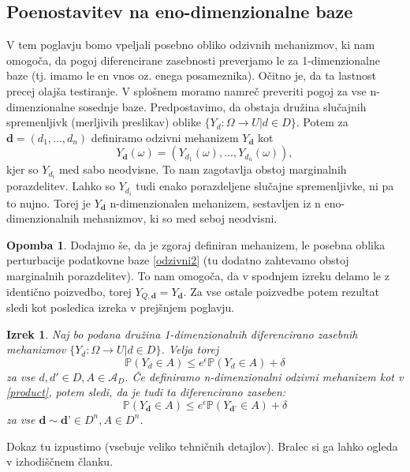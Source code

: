 \documentclass[12pt,a4paper]{amsart}
\theoremstyle{definition} %
\newtheorem{opomba}[definicija]{Opomba}
\theoremstyle{plain} %
\newtheorem{izrek}[definicija]{Izrek}
\begin{document}
\subsection{Poenostavitev na eno-dimenzionalne baze}
V tem poglavju bomo vpeljali posebno obliko odzivnih mehanizmov, ki nam omogoča, da pogoj diferencirane zasebnosti preverjamo le za 1-dimenzionalne baze (tj. imamo le en vnos oz. enega posameznika). Očitno je, da ta lastnost precej olajša testiranje. V splošnem moramo namreč preveriti pogoj za vse n-dimenzionalne sosednje baze.
\newline
\newline
Predpostavimo, da obstaja družina slučajnih spremenljivk (merljivih preslikav) oblike $\{ Y_d: \Omega \rightarrow U | d \in D\}$.  Potem za $\textbf{d} = (d_1,...,d_n)$ definiramo odzivni mehanizem $Y_{\textbf{d}}$ kot  
\begin{equation}\label{product}
Y_{\textbf{d}} (\omega) = (Y_{d_1} (\omega) , ... , Y_{d_n} (\omega)), \tag{5}
\end{equation}
kjer so $Y_{d_i}$ med sabo neodvisne. To nam zagotavlja obstoj marginalnih porazdelitev.  Lahko so $Y_{d_i}$ tudi enako porazdeljene slučajne spremenljivke, ni pa to nujno. Torej je $Y_{\textbf{d}}$ n-dimenzionalen mehanizem, sestavljen iz n eno-dimenzionalnih mehanizmov, ki so med seboj neodvisni. 
\newline
\newline
\begin{opomba} Dodajmo še, da je zgoraj definiran mehanizem, le posebna oblika perturbacije podatkovne baze \eqref{odzivni2} (tu dodatno zahtevamo obstoj marginalnih porazdelitev). To nam omogoča, da v spodnjem izreku delamo le z identično poizvedbo, torej $Y_{Q, \textbf{d}}=Y_{\textbf{d}}$. Za vse ostale poizvedbe potem rezultat sledi kot posledica izreka v prejšnjem poglavju. 
\end{opomba}
\begin{izrek} Naj bo podana družina 1-dimenzionalnih diferencirano zasebnih mehanizmov $\{ Y_d: \Omega \rightarrow U | d \in D\}$. Velja torej
$$\mathbb{P}(Y_d \in A) \leq e^\epsilon \mathbb{P}(Y_d \in A) + \delta$$ 
za vse $d,d' \in D, A \in \mathcal{A}_D$. Če definiramo n-dimenzionalni odzivni mehanizem kot v \eqref{product}, potem sledi, da je tudi ta diferencirano zaseben:
$$\mathbb{P}(Y_{\textbf{d}} \in A) \leq e^\epsilon \mathbb{P}(Y_{\textbf{d'}} \in A) + \delta$$
za vse $\textbf{d} \sim \textbf{d'} \in D^n, A \in D^n$.
\end{izrek}
Dokaz tu izpustimo (vsebuje veliko tehničnih detajlov). Bralec si ga lahko ogleda v izhodiščnem članku.
\end{document}
